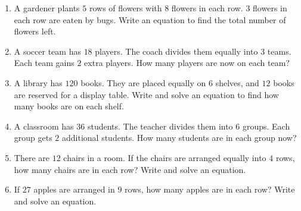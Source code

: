 \documentclass[12pt]{article}
\begin{document}
\begin{tcolorbox}[colframe=black!60, colback=white, 
coltitle=black, colbacktitle=black!15, fonttitle=\bfseries\Large, 
title=Problems, halign title=center, left=10pt, right=10pt, top=10pt, bottom=60pt]
\begin{enumerate}[start=11, itemsep=5em]
    
    
    \item A gardener plants \(5\) rows of flowers with \(8\) flowers in each row. \(3\) flowers in each row are eaten by bugs. Write an equation to find the total number of flowers left.
    \item A soccer team has \(18\) players. The coach divides them equally into \(3\) teams. Each team gains \(2\) extra players. How many players are now on each team?
    \item A library has \(120\) books. They are placed equally on \(6\) shelves, and \(12\) books are reserved for a display table. Write and solve an equation to find how many books are on each shelf.
    \item A classroom has \(36\) students. The teacher divides them into \(6\) groups. Each group gets \(2\) additional students. How many students are in each group now?

    \item There are \(12\) chairs in a room. If the chairs are arranged equally into \(4\) rows, how many chairs are in each row? Write and solve an equation.
    
    \item If \(27\) apples are arranged in \(9\) rows, how many apples are in each row? Write and solve an equation.
\end{enumerate}
\end{tcolorbox}

\vspace{1em}
\end{document}
